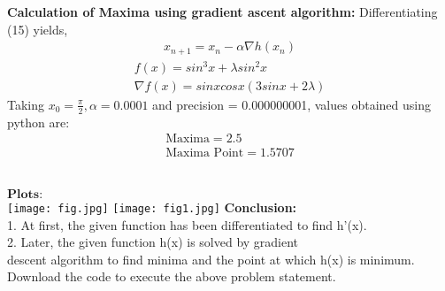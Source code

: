 \documentclass[10pt,a4paper]{report}
\let\vec\mathbf
\let\vec\mathbf
\begin{document}
\begin{multicols}{2}
\textbf{Calculation of Maxima using gradient ascent algorithm:}
Differentiating (15) yields,
\begin{align}
       \boxed{x_{n+1} = x_n - \alpha \nabla h(x_n)} 
\end{align}
\begin{align}
f(x)= sin^3 x+\lambda sin^2 x \\ 
\nabla f(x) = sinx cosx (3sinx+2\lambda)
\end{align}
\vspace{1mm}
Taking $x_0=\frac{\pi}{2},\alpha=0.0001$ and precision = 0.000000001, values obtained using python are:
    \begin{align}
        \boxed{\text{Maxima} =2.5}\\     
        \boxed{\text{Maxima Point} = 1.5707}
    \end{align}
\vspace{2mm} 
\\
\raggedright $\vec{Plots:}$ \\
\texttt{[image: fig.jpg]}
\label{fig:Figure}
\texttt{[image: fig1.jpg]}
\label{fig:Figure}
\textbf{Conclusion:}\\
1. At first, the given function has been differentiated to find h'(x).
\\
2. Later, the given function h(x) is solved by gradient   \\descent algorithm to find minima and the point at which h(x) is minimum.
Download the code to execute the above problem statement.
\vspace{4mm}
\\
\end{multicols}
\end{document}
